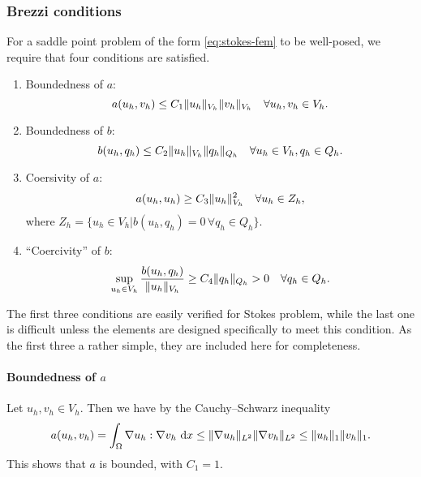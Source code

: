 \subsubsection{Brezzi conditions}
For a saddle point problem of the form \cref{eq:stokes-fem} to be well-posed, we require that four conditions are satisfied.
\begin{enumerate}
    \item Boundedness of $a$:
        \begin{equation}
            a(u_h, v_h) \leq C_1 \lVert u_h\rVert_{V_h} \lVert v_{h}\rVert_{V_h}
            \quad
            \forall u_h, v_h \in V_h.
        \end{equation}

    \item Boundedness of $b$:
        \begin{equation}
            b(u_h, q_h) \leq C_2 \lVert u_h\rVert_{V_h} \lVert q_{h}\rVert_{Q_h}
            \quad
            \forall {
                u_h \in V_h,
                q_h \in Q_h.
            }
        \end{equation}

    \item Coersivity of $a$:
        \begin{equation}
            a(u_h, u_h) \geq C_3 \lVert u_h\rVert_{V_h}^2
            \quad
            \forall u_h \in Z_h,
        \end{equation}
        where $Z_h = \{ u_h \in V_h | b(u_h, q_h) = 0 \, \forall q_h \in Q_h \}$.

    \item ``Coercivity'' of $b$:
        \begin{equation}
            \sup_{u_h \in V_h} \frac{
                b(u_h, q_h)
            }{
                \lVert u_h\rVert_{V_h}
            } \geq C_4 \lVert q_h\rVert_{Q_h}
            > 0
            \quad
            \forall q_h \in Q_h.
        \end{equation}
\end{enumerate}
The first three conditions are easily verified for Stokes problem, while the last one is difficult unless the elements are designed specifically to meet this condition.
As the first three a rather simple, they are included here for completeness.

\paragraph{Boundedness of \texorpdfstring{$a$}{a}}
Let $u_h, v_h \in V_h$.
Then we have by the Cauchy--Schwarz inequality %
\begin{equation}
    a(u_h, v_h)
    = \int_{\Omega} \nabla u_h : \nabla v_h \, \mathop{}\!\mathrm{d} x
    \leq \lVert\nabla u_h\rVert_{L^2} \lVert\nabla v_h\rVert_{L^2}
    \leq \lVert u_h\rVert_1 \lVert v_h\rVert_1.
\end{equation}
This shows that $a$ is bounded, with $C_1 = 1$.

